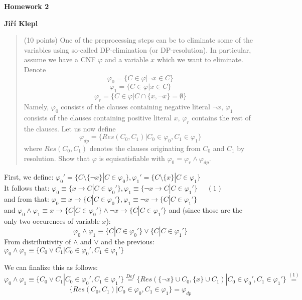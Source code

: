 \documentclass[a4paper,12pt]{article} %
\begin{document}
\begin{center}
    {\Large \bf Homework 2}
    \vspace{2mm}

    {\bf Jiří Klepl}

\end{center}

\vspace{0.4cm}

\begin{quote}
    (10 points) One of the preprocessing steps can be to eliminate some of the variables using so-called
DP-elimination (or DP-resolution). In particular, assume we have a CNF $\varphi$ and a variable $x$ which
we want to eliminate. Denote
$$\varphi_0 = \{C \in \varphi | \neg x \in C\}$$
$$\varphi_1 = \{C \in \varphi | x \in C\}$$
$$\varphi_r = \{C \in \varphi | C \cap \{x, \neg x\} = \emptyset\}$$
Namely, $\varphi_0$ consists of the clauses containing negative literal $\neg x$, $\varphi_1$ consists of the clauses containing
positive literal $x$, $\varphi_r$ contains the rest of the clauses. Let us now define
$$\varphi_{dp} = \{Res(C_0, C_1) | C_0 \in \varphi_0, C_1 \in \varphi_1\}$$
where $Res(C_0, C_1)$ denotes the clauses originating from $C_0$ and $C_1$ by resolution. Show that $\varphi$ is equisatisfiable with $\varphi_0 = \varphi_r \wedge \varphi_{dp}$.
\end{quote}

First, we define: $\varphi_0' = \{C \setminus \{\neg x\} | C \in \varphi_0\}, \varphi_1' = \{C \setminus \{x\} | C \in \varphi_1\}$ \\
It follows that: $\varphi_0 \equiv \{x \to C  | C \in \varphi_0'\}, \varphi_1 \equiv \{\neg x \to C | C \in \varphi_1'\}$ $\quad \left(1\right)$\\
and from that: $\varphi_0 \equiv x \to \{C  | C \in \varphi_0'\}, \varphi_1 \equiv \neg x \to \{C  | C \in \varphi_1'\}$ \\
and $\varphi_0 \wedge \varphi_1 \equiv x \to \{C  | C \in \varphi_0'\} \wedge \neg x \to \{C  | C \in \varphi_1'\}$
and (since those are the only two occurences of variable $x$):
$$\varphi_0 \wedge \varphi_1 \equiv \{C  | C \in \varphi_0'\} \vee \{C  | C \in \varphi_1'\}$$
From distributivity of $\wedge$ and $\vee$ and the previous: $\varphi_0 \wedge \varphi_1 \equiv \{C_0 \vee C_1 | C_0 \in \varphi_0', C_1 \in \varphi_1'\}$

We can finalize this as follows: $$\varphi_0 \wedge \varphi_1 \equiv \{C_0 \vee C_1 | C_0 \in \varphi_0', C_1 \in \varphi_1'\} \overset{Def}{=} \{Res(\{\neg x\} \cup C_0, \{x\} \cup C_1) | C_0 \in \varphi_0', C_1 \in \varphi_1'\} \overset{\left(1\right)}{=} $$
$$\{Res(C_0, C_1) | C_0 \in \varphi_0, C_1 \in \varphi_1\} = \varphi_{dp}$$
\end{document}
